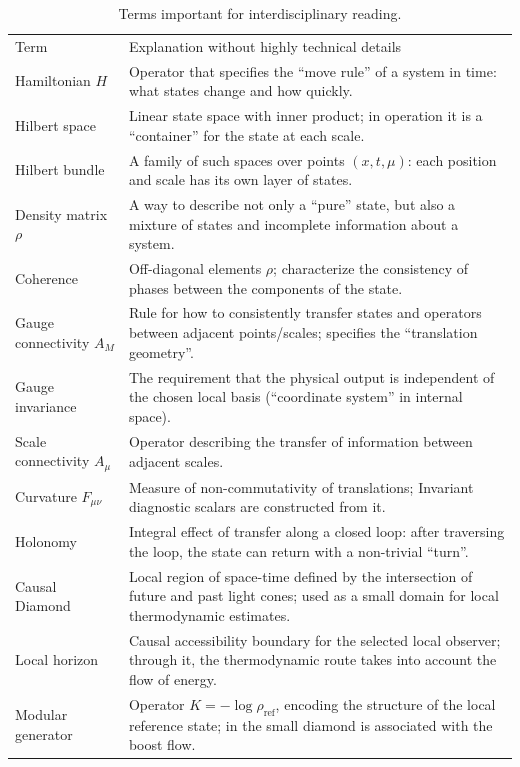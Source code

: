 \documentclass[11pt,a4paper]{article}
\theoremstyle{definition}
\theoremstyle{plain}
\theoremstyle{remark}
\begin{document}
\begin{table}[H]
\centering
\caption{Terms important for interdisciplinary reading.}
\label{tab:appendix_c_terms}
\small
\begin{tabular}{@{}p{3.6cm}p{10.4cm}@{}}
\toprule
Term & Explanation without highly technical details \\
Hamiltonian $H$ & Operator that specifies the ``move rule'' of a system in time: what states change and how quickly. \\
\midrule
Hilbert space & Linear state space with inner product; in operation it is a ``container'' for the state at each scale. \\
Hilbert bundle & A family of such spaces over points $(x,t,\mu)$: each position and scale has its own layer of states. \\
Density matrix $\rho$ & A way to describe not only a ``pure'' state, but also a mixture of states and incomplete information about a system. \\
Coherence & Off-diagonal elements $\rho$; characterize the consistency of phases between the components of the state. \\
Gauge connectivity $A_M$ & Rule for how to consistently transfer states and operators between adjacent points/scales; specifies the ``translation geometry''. \\
Gauge invariance & The requirement that the physical output is independent of the chosen local basis (``coordinate system'' in internal space). \\
Scale connectivity $A_\mu$ & Operator describing the transfer of information between adjacent scales. \\
Curvature $F_{\mu\nu}$ & Measure of non-commutativity of translations; Invariant diagnostic scalars are constructed from it. \\
Holonomy & Integral effect of transfer along a closed loop: after traversing the loop, the state can return with a non-trivial ``turn''. \\
Causal Diamond & Local region of space-time defined by the intersection of future and past light cones; used as a small domain for local thermodynamic estimates. \\
Local horizon & Causal accessibility boundary for the selected local observer; through it, the thermodynamic route takes into account the flow of energy. \\
Modular generator & Operator $K=-\log\rho_{\mathrm{ref}}$, encoding the structure of the local reference state; in the small diamond is associated with the boost flow. \\

\end{tabular}
\end{table}
\end{document}
